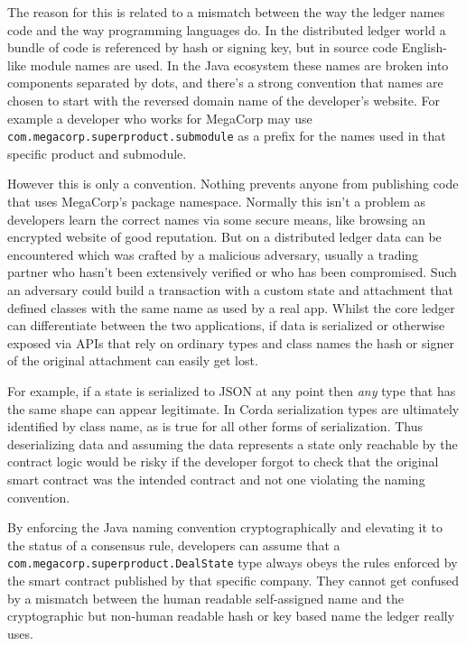 \documentclass{article}
\begin{document}
The reason for this is related to a mismatch between the way the ledger names code and the way programming
languages do. In the distributed ledger world a bundle of code is referenced by hash or signing key, but in source
code English-like module names are used. In the Java ecosystem these names are broken into components separated by
dots, and there's a strong convention that names are chosen to start with the reversed domain name of the
developer's website. For example a developer who works for MegaCorp may use
\texttt{com.megacorp.superproduct.submodule} as a prefix for the names used in that specific product and submodule.

However this is only a convention. Nothing prevents anyone from publishing code that uses MegaCorp's package
namespace. Normally this isn't a problem as developers learn the correct names via some secure means, like browsing
an encrypted website of good reputation. But on a distributed ledger data can be encountered which was crafted by a
malicious adversary, usually a trading partner who hasn't been extensively verified or who has been compromised.
Such an adversary could build a transaction with a custom state and attachment that defined classes with the same
name as used by a real app. Whilst the core ledger can differentiate between the two applications, if data is
serialized or otherwise exposed via APIs that rely on ordinary types and class names the hash or signer of the
original attachment can easily get lost.

For example, if a state is serialized to JSON at any point then \emph{any} type that has the same shape can appear
legitimate. In Corda serialization types are ultimately identified by class name, as is true for all other forms of
serialization. Thus deserializing data and assuming the data represents a state only reachable by the contract
logic would be risky if the developer forgot to check that the original smart contract was the intended contract
and not one violating the naming convention.

By enforcing the Java naming convention cryptographically and elevating it to the status of a consensus rule,
developers can assume that a \texttt{com.megacorp.superproduct.DealState} type always obeys the rules enforced by
the smart contract published by that specific company. They cannot get confused by a mismatch between the human
readable self-assigned name and the cryptographic but non-human readable hash or key based name the ledger really
uses.

\end{document}
